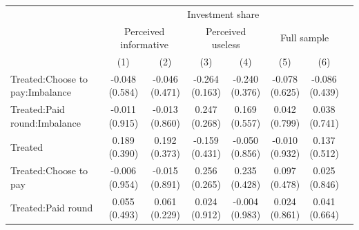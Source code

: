 \renewcommand\cellalign{t}
\begin{threeparttable}
\begin{tabular}{lccccccc}
\toprule
 & \multicolumn{6}{c}{Investment share} \\
\cmidrule(lr){2-7} 
 & \multicolumn{2}{c}{Perceived informative} & \multicolumn{2}{c}{Perceived useless} & \multicolumn{2}{c}{Full sample} \\
\cmidrule(lr){2-3} \cmidrule(lr){4-5} \cmidrule(lr){6-7} 
 & (1) & (2) & (3) & (4) & (5) & (6) \\
\midrule
\addlinespace
Treated:Choose to pay:Imbalance & \makecell{-0.048 \\ (0.584) } & \makecell{-0.046 \\ (0.471) } & \makecell{-0.264 \\ (0.163) } & \makecell{-0.240 \\ (0.376) } & \makecell{-0.078 \\ (0.625) } & \makecell{-0.086 \\ (0.439) } \\
Treated:Paid round:Imbalance & \makecell{-0.011 \\ (0.915) } & \makecell{-0.013 \\ (0.860) } & \makecell{0.247 \\ (0.268) } & \makecell{0.169 \\ (0.557) } & \makecell{0.042 \\ (0.799) } & \makecell{0.038 \\ (0.741) } \\
Treated & \makecell{0.189 \\ (0.390) } & \makecell{0.192 \\ (0.373) } & \makecell{-0.159 \\ (0.431) } & \makecell{-0.050 \\ (0.856) } & \makecell{-0.010 \\ (0.932) } & \makecell{0.137 \\ (0.512) } \\
Treated:Choose to pay & \makecell{-0.006 \\ (0.954) } & \makecell{-0.015 \\ (0.891) } & \makecell{0.256 \\ (0.265) } & \makecell{0.235 \\ (0.428) } & \makecell{0.097 \\ (0.478) } & \makecell{0.025 \\ (0.846) } \\
Treated:Paid round & \makecell{0.055 \\ (0.493) } & \makecell{0.061 \\ (0.229) } & \makecell{0.024 \\ (0.912) } & \makecell{-0.004 \\ (0.983) } & \makecell{0.024 \\ (0.861) } & \makecell{0.041 \\ (0.664) } \\

\end{tabular}
\end{threeparttable}
